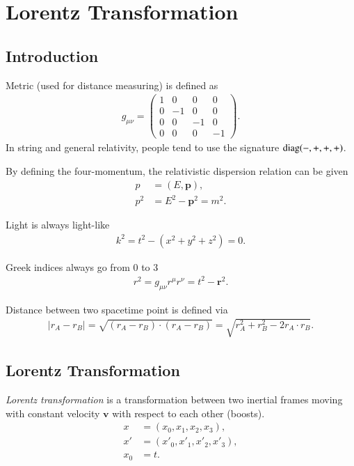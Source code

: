 \chapter{Lorentz Transformation}
\section{Introduction}
Metric (used for distance measuring) is defined as
\begin{align}
   g_{\mu\nu} = \begin{pmatrix} 1 & 0 & 0 & 0 \\ 0 & -1 & 0 & 0 \\ 0 & 0 & -1 & 0 \\ 0 & 0 & 0 & -1\end{pmatrix}.
\end{align}
In string and general relativity, people tend to use the signature $\text{diag}(-, +, +, +)$.

By defining the four-momentum, the relativistic dispersion relation can be given
\begin{align}
   p &= (E, \pmb{p}), \\
   p^2 &= E^2 - \pmb{p}^2 = m^2.
\end{align}

Light is always light-like
\begin{align*}
   k^2 = t^2 - (x^2 + y^2 + z^2) = 0.
\end{align*}

Greek indices always go from $0$ to $3$
\begin{align}
   r^2 = g_{\mu\nu} r^\mu r^\nu = t^2 - \pmb{r}^2.
\end{align}

Distance between two spacetime point is defined via
\begin{align}
   \left| r_A - r_B \right|  = \sqrt{(r_A - r_B)\cdot(r_A - r_B)} = \sqrt{r_A^2 + r_B^2 - 2r_A\cdot r_B}.
\end{align}

\section{Lorentz Transformation}
\textit{Lorentz transformation} is a transformation between two inertial frames moving with constant velocity $\pmb{v}$ with respect to each other (boosts).
\begin{align*}
   x &= (x_0, x_1, x_2, x_3), \\
   x' &= (x'_0, x'_1, x'_2, x'_3), \\
   x_0 &=  t .
\end{align*}

